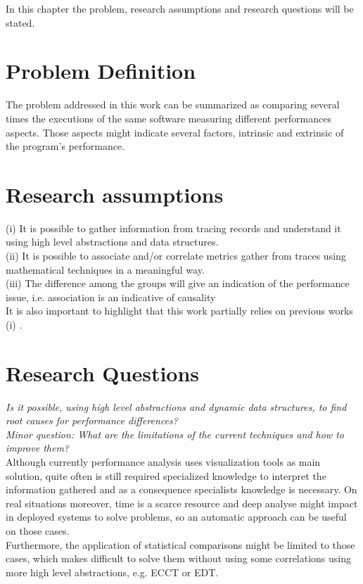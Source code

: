 \label{sec:Theme1}
In this chapter the problem, research assumptions and research questions will be stated.
\section{Problem Definition}
The problem addressed in this work can be summarized as comparing several times the executions of the same software measuring different performances aspects. Those aspects might indicate several factors, intrinsic and extrinsic of the program's performance.
\section{Research assumptions}
(i) It is possible to gather information from tracing records and understand it using high level abstractions and data structures.\\
(ii) It is possible to associate and/or correlate metrics gather from traces using mathematical techniques in a meaningful way.\\
(iii) The difference among the groups will give an indication of the performance issue, i.e. association is an indicative of causality\\
It is also important to highlight that this work partially relies on previous works (i) \cite{doray_thesis}.

\section{Research Questions}
\textit{Is it possible, using high level abstractions and dynamic data structures, to find root causes for performance differences?}\\
\textit{Minor question: What are the limitations of the current techniques and how to improve them?}\\
  
Although currently performance analysis uses visualization tools as main solution, quite often is still required specialized knowledge to interpret the information gathered and as a consequence specialists knowledge is necessary. On real situations moreover, time is a scarce resource and deep analyse might impact in deployed systems to solve problems, so an automatic approach can be useful on those cases.\\
Furthermore, the application of statistical comparisons might be limited to those cases, which makes difficult to solve them without using some correlations using more high level abstractions, e.g. ECCT or EDT.

